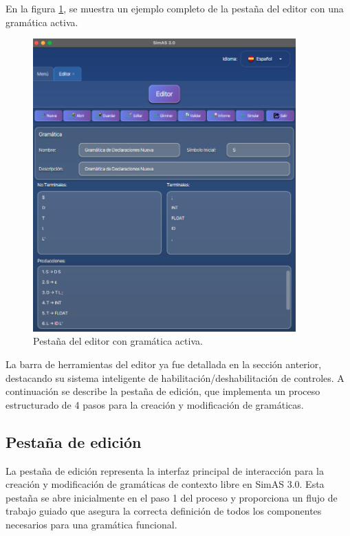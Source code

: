 En la figura \ref{fig:d3}, se muestra un ejemplo completo de la pestaña del editor con una gramática activa.

\needspace{8cm}
\begin{figure}[H]
\centering
\includegraphics[width=0.9\textwidth]{figuras2/ejemplo_practico/editor.png}
\caption{Pestaña del editor con gramática activa.}
\label{fig:d3}
\end{figure}

La barra de herramientas del editor ya fue detallada en la sección anterior, destacando su sistema inteligente de habilitación/deshabilitación de controles. A continuación se describe la pestaña de edición, que implementa un proceso estructurado de 4 pasos para la creación y modificación de gramáticas.

\subsection{Pestaña de edición}

La pestaña de edición representa la interfaz principal de interacción para la creación y modificación de gramáticas de contexto libre en SimAS 3.0. Esta pestaña se abre inicialmente en el paso 1 del proceso y proporciona un flujo de trabajo guiado que asegura la correcta definición de todos los componentes necesarios para una gramática funcional.

